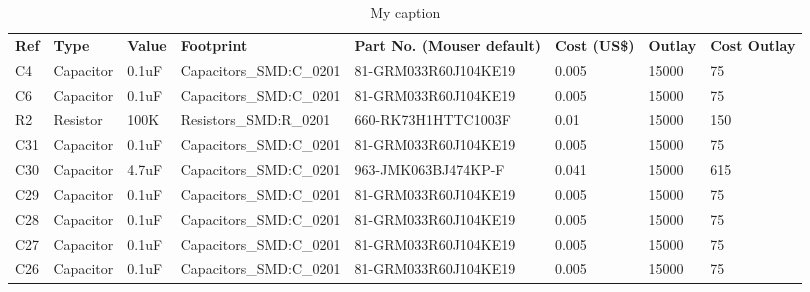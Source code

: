 \begin{landscape}
\begin{table}[]
\centering
\tiny
\caption{My caption}
\label{my-label}
\begin{tabular}{llllllll}
\textbf{Ref}   & \textbf{Type} & \textbf{Value}             & \textbf{Footprint}              & \textbf{Part No. (Mouser default)}   & \textbf{Cost (US\$)} & \textbf{Outlay} & \textbf{Cost Outlay} \\
C4             & Capacitor     & 0.1uF                      & Capacitors\_SMD:C\_0201         & 81-GRM033R60J104KE19                 & 0.005                & 15000           & 75                   \\
C6             & Capacitor     & 0.1uF                      & Capacitors\_SMD:C\_0201         & 81-GRM033R60J104KE19                 & 0.005                & 15000           & 75                   \\
R2             & Resistor      & 100K                       & Resistors\_SMD:R\_0201          & 660-RK73H1HTTC1003F                  & 0.01                 & 15000           & 150                  \\
C31            & Capacitor     & 0.1uF                      & Capacitors\_SMD:C\_0201         & 81-GRM033R60J104KE19                 & 0.005                & 15000           & 75                   \\
C30            & Capacitor     & 4.7uF                      & Capacitors\_SMD:C\_0201         & 963-JMK063BJ474KP-F                  & 0.041                & 15000           & 615                  \\
C29            & Capacitor     & 0.1uF                      & Capacitors\_SMD:C\_0201         & 81-GRM033R60J104KE19                 & 0.005                & 15000           & 75                   \\
C28            & Capacitor     & 0.1uF                      & Capacitors\_SMD:C\_0201         & 81-GRM033R60J104KE19                 & 0.005                & 15000           & 75                   \\
C27            & Capacitor     & 0.1uF                      & Capacitors\_SMD:C\_0201         & 81-GRM033R60J104KE19                 & 0.005                & 15000           & 75                   \\
C26            & Capacitor     & 0.1uF                      & Capacitors\_SMD:C\_0201         & 81-GRM033R60J104KE19                 & 0.005                & 15000           & 75                   \\

\end{tabular}
\end{table}
\end{landscape}
